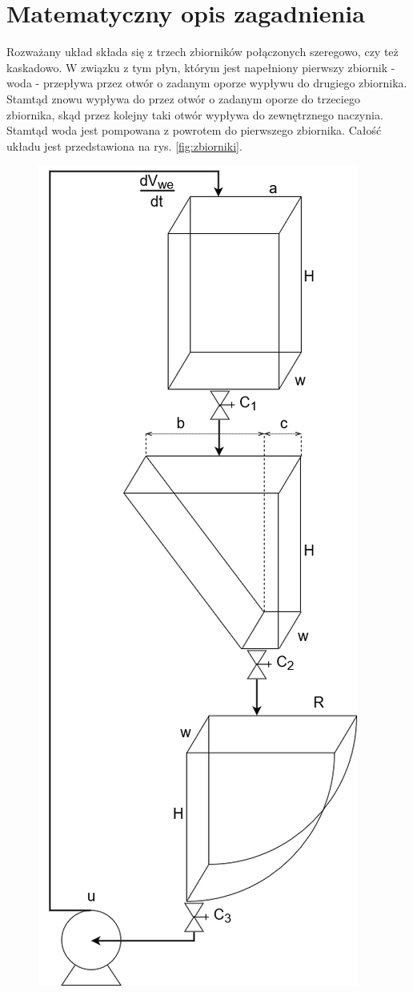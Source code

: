 \chapter{Matematyczny opis zagadnienia}
\label{cha:model}

Rozważany układ składa się z trzech zbiorników połączonych szeregowo, czy też kaskadowo. W związku z tym płyn, którym jest napełniony pierwszy zbiornik - woda - przepływa przez otwór o zadanym oporze wypływu do drugiego zbiornika. Stamtąd znowu wypływa do przez otwór o zadanym oporze do trzeciego zbiornika, skąd przez kolejny taki otwór wypływa do zewnętrznego naczynia. Stamtąd woda jest pompowana z powrotem do pierwszego zbiornika. Całość układu jest przedstawiona na rys. \ref{fig:zbiorniki}.


\begin{figure}[ht]
	\centering
	\includegraphics[scale=.5]{Grafika/schemat_zbiornikow}

\end{figure}
